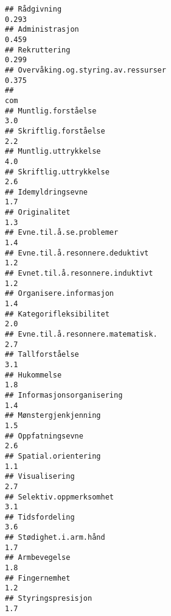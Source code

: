 \documentclass[
]{article}
\begin{document}
\begin{verbatim}
## Rådgivning                                                                       0.293
## Administrasjon                                                                   0.459
## Rekruttering                                                                     0.299
## Overvåking.og.styring.av.ressurser                                               0.375
##                                                                                  com
## Muntlig.forståelse                                                               3.0
## Skriftlig.forståelse                                                             2.2
## Muntlig.uttrykkelse                                                              4.0
## Skriftlig.uttrykkelse                                                            2.6
## Idemyldringsevne                                                                 1.7
## Originalitet                                                                     1.3
## Evne.til.å.se.problemer                                                          1.4
## Evne.til.å.resonnere.deduktivt                                                   1.2
## Evnet.til.å.resonnere.induktivt                                                  1.2
## Organisere.informasjon                                                           1.4
## Kategorifleksibilitet                                                            2.0
## Evne.til.å.resonnere.matematisk.                                                 2.7
## Tallforståelse                                                                   3.1
## Hukommelse                                                                       1.8
## Informasjonsorganisering                                                         1.4
## Mønstergjenkjenning                                                              1.5
## Oppfatningsevne                                                                  2.6
## Spatial.orientering                                                              1.1
## Visualisering                                                                    2.7
## Selektiv.oppmerksomhet                                                           3.1
## Tidsfordeling                                                                    3.6
## Stødighet.i.arm.hånd                                                             1.7
## Armbevegelse                                                                     1.8
## Fingernemhet                                                                     1.2
## Styringspresisjon                                                                1.7

\end{verbatim}
\end{document}
